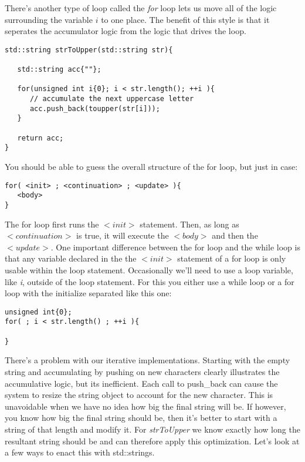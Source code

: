 \documentclass[]{tufte-handout}
\begin{document}
There's another type of loop called the \textit{for} loop lets us move all of the logic surrounding the variable $i$ to one place.  The benefit of this style is that it seperates the accumulator logic from the logic that drives the loop.
\begin{verbatim}
std::string strToUpper(std::string str){
   
   std::string acc{""};   
    	
   for(unsigned int i{0}; i < str.length(); ++i ){
      // accumulate the next uppercase letter
      acc.push_back(toupper(str[i]));
   }
   
   return acc;
}
\end{verbatim}

You should be able to guess the overall structure of the for loop, but just in case:
\begin{verbatim}
for( <init> ; <continuation> ; <update> ){
   <body>
}
\end{verbatim}
The for loop first runs the $<init>$ statement. Then, as long as $<continuation>$ is true, it will execute the $<body>$ and then the $<update>$. One important difference between the for loop and the while loop is that any variable declared in the the $<init>$ statement of a for loop is only usable within the loop statement. Occasionally we'll need to use a loop variable, like \textit{i}, outside of the loop statement. For this you either use a while loop or a for loop with the initialize separated like this one:
\begin{verbatim}
unsigned int{0};
for( ; i < str.length() ; ++i ){

}
\end{verbatim}

There's a problem with our iterative implementations. Starting with the empty string and accumulating by pushing on new characters clearly illustrates the accumulative logic, but its inefficient.  Each call to push\_back can cause the system to resize the string object to account for the new character.  This is unavoidable when we have no idea how big the final string will be. If however, you know how big the final string should be, then it's better to start with a string of that length and modify it.  For \textit{strToUpper} we know exactly how long the resultant string should be and can therefore apply this optimization. Let's look at a few ways to enact this with std::strings. 
\end{document}
